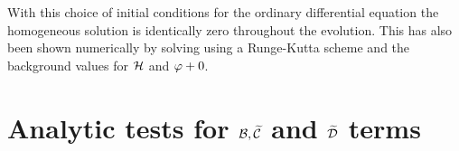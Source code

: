 With this choice of initial conditions for the ordinary differential equation the homogeneous
solution is identically zero throughout the evolution. This has also been shown numerically by
solving  using a Runge-Kutta scheme and the background values for
$\mathcal{H}$ and $\varphi+0$.


\section{Analytic tests for \texorpdfstring{$\mathcal{B},\widetilde{\mathcal{C}}$ and $\widetilde{\mathcal{D}}$}{B, C and D} terms}
\label{sec:apx-codetests}

